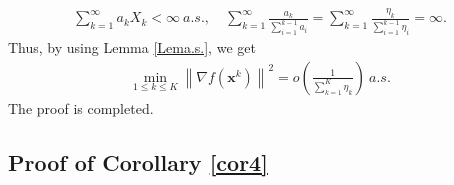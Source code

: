 \documentclass[twoside,11pt]{article}
\begin{document}
\begin{equation}
   	\begin{aligned}
   	\sum_{k=1}^{\infty}a_k X_k<\infty\ a.s.,\quad
   	\sum_{k=1}^{\infty}\frac{a_k}{\sum_{i=1}^{k-1}a_i}=\sum_{k=1}^{\infty}\frac{\eta_k}{\sum_{i=1}^{k-1}\eta_i}=\infty.\nonumber
   	\end{aligned}
\end{equation}
Thus, by using Lemma \ref{Lema.s.}, we get
\begin{align}
   	\min_{1\le k\le K}\left\| \nabla f(\mathbf{x}^k)\right\|^2=o\left( \frac{1}{\sum_{k=1}^{K}\eta_{k}}\right) \ a.s. \nonumber
\end{align}
The proof is completed.
   	
\subsection{Proof of Corollary \ref{cor4}}\label{Proof of cor4}
\end{document}
